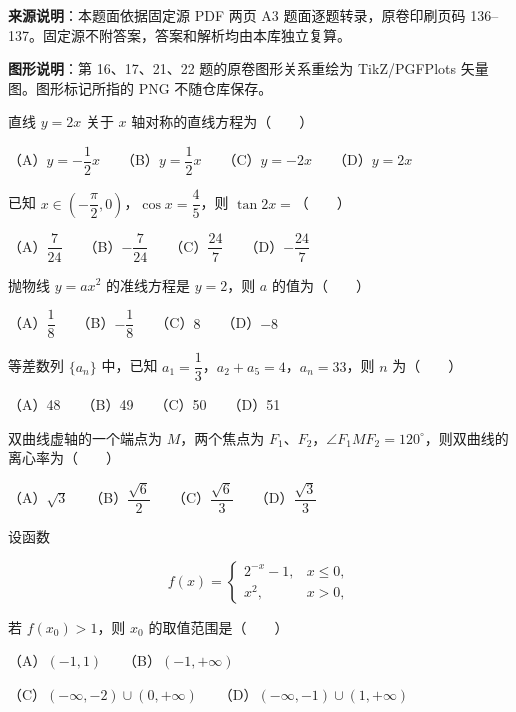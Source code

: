 


\begin{gktip}
\textbf{来源说明}：本题面依据固定源 PDF 两页 A3 题面逐题转录，原卷印刷页码 136–137。固定源不附答案，答案和解析均由本库独立复算。

\textbf{图形说明}：第 16、17、21、22 题的原卷图形关系重绘为 TikZ/PGFPlots 矢量图。图形标记所指的 PNG 不随仓库保存。
\end{gktip}


\begin{question}
直线 $y=2x$ 关于 $x$ 轴对称的直线方程为\mbox{（　　）}

（A）$y=-\dfrac12x$　　（B）$y=\dfrac12x$　　（C）$y=-2x$　　（D）$y=2x$

\end{question}
\begin{question}
已知 $x\in\left(-\dfrac\pi2,0\right)$，$\cos x=\dfrac45$，则 $\tan2x=$\mbox{（　　）}

（A）$\dfrac7{24}$　　（B）$-\dfrac7{24}$　　（C）$\dfrac{24}{7}$　　（D）$-\dfrac{24}{7}$

\end{question}
\begin{question}
抛物线 $y=ax^2$ 的准线方程是 $y=2$，则 $a$ 的值为\mbox{（　　）}

（A）$\dfrac18$　　（B）$-\dfrac18$　　（C）$8$　　（D）$-8$

\end{question}
\begin{question}
等差数列 $\{a_n\}$ 中，已知 $a_1=\dfrac13$，$a_2+a_5=4$，$a_n=33$，则 $n$ 为\mbox{（　　）}

（A）48　　（B）49　　（C）50　　（D）51

\end{question}
\begin{question}
双曲线虚轴的一个端点为 $M$，两个焦点为 $F_1\text{、}F_2$，$\angle F_1MF_2=120^\circ$，则双曲线的离心率为\mbox{（　　）}

（A）$\sqrt3$　　（B）$\dfrac{\sqrt6}{2}$　　（C）$\dfrac{\sqrt6}{3}$　　（D）$\dfrac{\sqrt3}{3}$

\end{question}
\begin{question}
设函数

\nopagebreak[4]
\[
f(x)=
\begin{cases}
2^{-x}-1,&x\leqslant0,\\
x^2,&x>0,
\end{cases}
\]

若 $f(x_0)>1$，则 $x_0$ 的取值范围是\mbox{（　　）}

（A）$(-1,1)$　　（B）$(-1,+\infty)$

（C）$(-\infty,-2)\cup(0,+\infty)$　　（D）$(-\infty,-1)\cup(1,+\infty)$

\end{question}
